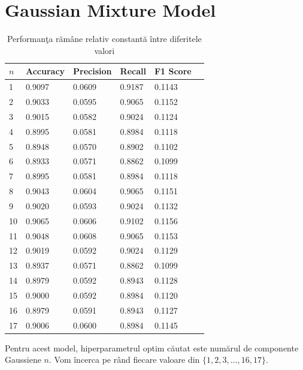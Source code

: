 \noindent

\section{Gaussian Mixture Model}

\begin{table}[H]
  \centering
  \begin{tabularx}{\textwidth}{
      |X
      |X
      |X
      |X
      |X
      |X|
  }
  \hline
  $n$ & {Accuracy} & {Precision} & {Recall} & {F1 Score} \\
  \hline
  \rowcolor{gray!20} 1 & 0.9097 & 0.0609 & 0.9187 & 0.1143 \\
  2 & 0.9033 & 0.0595 & 0.9065 & 0.1152 \\
  \rowcolor{gray!20} 3 & 0.9015 & 0.0582 & 0.9024 & 0.1124 \\
  4 & 0.8995 & 0.0581 & 0.8984 & 0.1118 \\
  \rowcolor{gray!20} 5 & 0.8948 & 0.0570 & 0.8902 & 0.1102 \\
  6 & 0.8933 & 0.0571 & 0.8862 & 0.1099 \\
  \rowcolor{gray!20} 7 & 0.8995 & 0.0581 & 0.8984 & 0.1118 \\
  8 & 0.9043 & 0.0604 & 0.9065 & 0.1151 \\
  \rowcolor{gray!20} 9 & 0.9020 & 0.0593 & 0.9024 & 0.1132 \\
  10 & 0.9065 & 0.0606 & 0.9102 & 0.1156 \\
  \rowcolor{gray!20} 11 & 0.9048 & 0.0608 & 0.9065 & 0.1153 \\
  12 & 0.9019 & 0.0592 & 0.9024 & 0.1129 \\
  \rowcolor{gray!20} 13 & 0.8937 & 0.0571 & 0.8862 & 0.1099 \\
  14 & 0.8979 & 0.0592 & 0.8943 & 0.1128 \\
  \rowcolor{gray!20} 15 & 0.9000 & 0.0592 & 0.8984 & 0.1120 \\
  16 & 0.8979 & 0.0591 & 0.8943 & 0.1127 \\
  \rowcolor{gray!20} 17 & 0.9006 & 0.0600 & 0.8984 & 0.1145 \\
  \hline
  \end{tabularx}
  \caption{Performanţa rămâne relativ constantă între diferitele valori}
\end{table}



Pentru acest model, hiperparametrul optim 
căutat este numărul de componente Gaussiene $n$. Vom încerca pe rând fiecare valoare
din $\{1, 2, 3, \ldots, 16, 17\}$.

